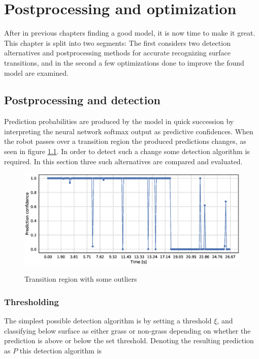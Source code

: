 \chapter{Postprocessing and optimization}

After in previous chapters finding a good model, it is now time to make it great. This chapter is split into two segments: The first considers two detection alternatives and postprocessing methods for accurate recognizing surface transitions, and in the second a few optimizations done to improve the found model are examined.

\section{Postprocessing and detection}

Prediction probabilities are produced by the model in quick succession by interpreting the neural network softmax output as predictive confidences. When the robot passes over a transition region the produced predictions changes, as seen in figure \ref{fig:detect_no}. In order to detect such a change some detection algorithm is required. In this section three such alternatives are compared and evaluated.  


\begin{figure}
	\includegraphics[scale=0.5]{figs_temp/detect_nothing}
	\label{fig:detect_no}
	\caption{Transition region with some outliers}
\end{figure}

\subsection{Thresholding}

The simplest possible detection algorithm is by setting a threshold $\xi$, and classifying below surface as either grass or non-grass depending on whether the prediction is above or below the set threshold. Denoting the resulting prediction as $P$ this detection algorithm is 

